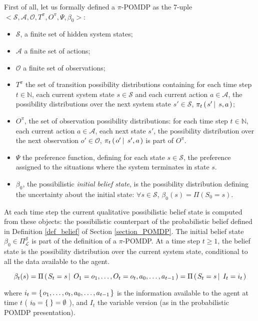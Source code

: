 First of all, let us formally defined a $\pi$-POMDP as the 
$7$-uple $<\mathcal{S},\mathcal{A},\mathcal{O},T^{\pi},O^{\pi},\Psi,\beta_0>$:
\begin{itemize}
\item $\mathcal{S}$, a finite set of hidden system states;
\item $\mathcal{A}$ a finite set of actions;
\item $\mathcal{O}$ a finite set of observations;
\item $T^{\pi}$ the set of transition possibility distributions
containing for each time step $t \in \mathbb{N}$, each current system state $s \in \mathcal{S}$
and each current action $a \in \mathcal{A}$, the possibility distributions over the next system state $s' \in \mathcal{S}$, 
$\pi_t \left( \left. s' \, \right| \left. \, s, a \right. \right)$;
\item $O^{\pi}$, the set of observation possibility distributions: 
for each time step $t \in \mathbb{N}$, each current action $a \in \mathcal{A}$, 
each next state $s'$, the possibility distribution over the next observation $o' \in \mathcal{O}$,
$\pi_t \left( \left.  o' \, \right| \left. \, s',a  \right. \right)$ is part of $O^{\pi}$.
\item $\Psi$ the preference function, defining for each state $s \in \mathcal{S}$, 
the preference assigned to the situations where the system terminates in state $s$.
\item $\beta_0$, the possibilistic \textit{initial belief state},
is the possibility distribution defining the uncertainty about the initial state: 
$\forall s \in \mathcal{S}$, $\beta_0(s) = \Pi(S_0 = s)$. 
\end{itemize}

At each time step the current qualitative possibilistic belief state 
is computed from these objects:
the possibilistic counterpart of the probabilistic belief defined in Definition \ref{def_belief} of Section \ref{section_POMDP}.
The initial belief state $\beta_0 \in \Pi^{\mathcal{S}}_{\mathcal{L}}$ is part of the definition of a $\pi$-POMDP.
At a time step $t \geqslant 1$, the belief state is the possibility distribution
over the current system state, conditional to all the data available to the agent. 
\begin{Def}
\label{def_QualPossBel}
\begin{equation}
\beta_{t}(s) = \Pi \left( \left.  S_t = s \, \right| \left. \, O_1=o_1, \ldots, O_t=o_t, a_0, \ldots, a_{t-1}  \right. \right) = \Pi \left( \left.  S_t = s \, \right| \left. \, I_t = i_t  \right. \right)
\end{equation}
\end{Def}
where $i_t = \left\{ \left. o_1,\ldots,o_t,a_0,\ldots,a_{t-1} \right. \right\}$ 
is the information available to the agent at time $t$ ( $i_0 = \left\{ \left.  \right. \right\} = \emptyset$ ),
and $I_t$ the variable version (as in the probabilistic POMDP presentation).

